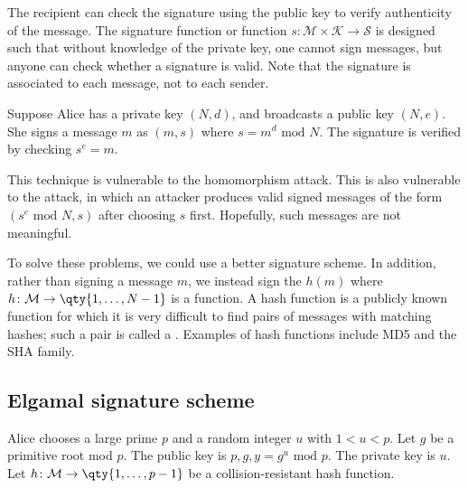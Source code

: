 The recipient can check the signature using the public key to verify authenticity of the message.
The signature function or  function $s \colon \mathcal M \times \mathcal K \to \mathcal S$ is designed such that without knowledge of the private key, one cannot sign messages, but anyone can check whether a signature is valid.
Note that the signature is associated to each message, not to each sender.
\begin{example}
    Suppose Alice has a private key $(N, d)$, and broadcasts a public key $(N, e)$.
    She signs a message $m$ as $(m, s)$ where $s = m^d \text{ mod } N$.
    The signature is verified by checking $s^e = m$.

    This technique is vulnerable to the homomorphism attack.
    This is also vulnerable to the  attack, in which an attacker produces valid signed messages of the form $(s^e \text{ mod } N, s)$ after choosing $s$ first.
    Hopefully, such messages are not meaningful.

    To solve these problems, we could use a better signature scheme.
    In addition, rather than signing a message $m$, we instead sign the  $h(m)$ where $h \colon \mathcal M \to \qty{1, \dots, N-1}$ is a  function.
    A hash function is a publicly known function for which it is very difficult to find pairs of messages with matching hashes; such a pair is called a .
    Examples of hash functions include MD5 and the SHA family.
\end{example}

\subsection{Elgamal signature scheme}
Alice chooses a large prime $p$ and a random integer $u$ with $1 < u < p$.
Let $g$ be a primitive root mod $p$.
The public key is $p, g, y = g^u \text{ mod } p$.
The private key is $u$.
Let $h \colon \mathcal M \to \qty{1, \dots, p-1}$ be a collision-resistant hash function.

